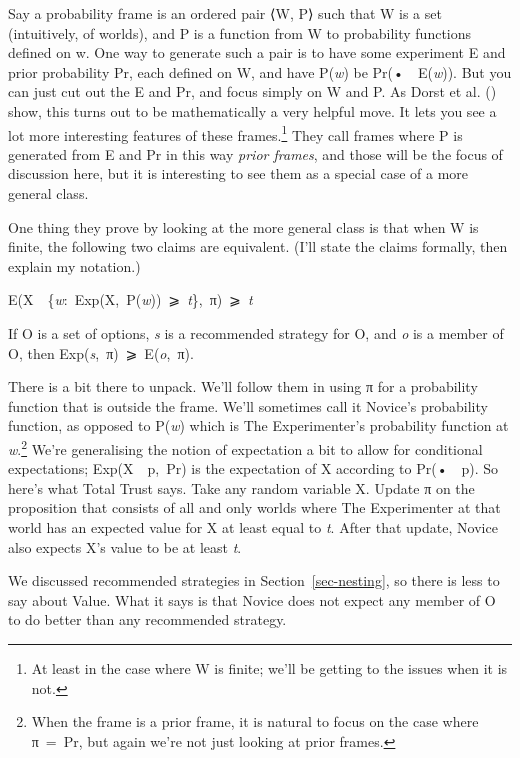 \documentclass[
  10pt,
  letterpaper,
  DIV=11,
  numbers=noendperiod,
  twoside]{scrartcl}
\providecommand{\tightlist}{%
  \setlength{\itemsep}{0pt}\setlength{\parskip}{0pt}}\usepackage{longtable,booktabs,array}
\begin{document}
Say a probability frame is an ordered pair ⟨W, P⟩ such that W is a set
(intuitively, of worlds), and P is a function from W to probability
functions defined on w. One way to generate such a pair is to have some
experiment E and prior probability Pr, each defined on W, and have
P(\emph{w}) be Pr(•~\textbar~E(\emph{w})). But you can just cut out the
E and Pr, and focus simply on W and P. As Dorst et al.
() show, this turns out to be
mathematically a very helpful move. It lets you see a lot more
interesting features of these frames.\footnote{At least in the case
  where W is finite; we'll be getting to the issues when it is not.}
They call frames where P is generated from E and Pr in this way
\emph{prior frames}, and those will be the focus of discussion here, but
it is interesting to see them as a special case of a more general class.

One thing they prove by looking at the more general class is that when W
is finite, the following two claims are equivalent. (I'll state the
claims formally, then explain my notation.)

\begin{description}
\tightlist
\item[Total Trust]
E(X~\textbar~\{\emph{w}:~Exp(X,~P(\emph{w}))~⩾~\emph{t}\},~π)~⩾~\emph{t}
\item[Value]
If O is a set of options, \emph{s} is a recommended strategy for O, and
\emph{o} is a member of O, then Exp(\emph{s},~π)~⩾~E(\emph{o},~π).
\end{description}

There is a bit there to unpack. We'll follow them in using π for a
probability function that is outside the frame. We'll sometimes call it
Novice's probability function, as opposed to P(\emph{w}) which is The
Experimenter's probability function at \emph{w}.\footnote{When the frame
  is a prior frame, it is natural to focus on the case where π~=~Pr, but
  again we're not just looking at prior frames.} We're generalising the
notion of expectation a bit to allow for conditional expectations;
Exp(X~\textbar~p,~Pr) is the expectation of X according to
Pr(•~\textbar~p). So here's what Total Trust says. Take any random
variable X. Update π on the proposition that consists of all and only
worlds where The Experimenter at that world has an expected value for X
at least equal to \emph{t}. After that update, Novice also expects X's
value to be at least \emph{t}.

We discussed recommended strategies in Section~\ref{sec-nesting}, so
there is less to say about Value. What it says is that Novice does not
expect any member of O to do better than any recommended strategy.
\end{document}
